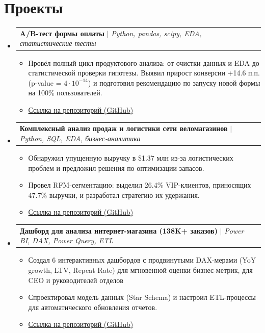 \documentclass[letterpaper,11pt]{article}
\makeatletter
\newcommand{\resumeItem}[1]{
  \item\small{
    {#1 \vspace{-2pt}}
  }
}
\newcommand{\resumeProjectHeading}[2]{
    \item
    \begin{tabular*}{0.97\textwidth}{l@{\extracolsep{\fill}}r}
      \small#1 & #2 \\
    \end{tabular*}\vspace{-7pt}
}
\newcommand{\resumeSubHeadingListStart}{\begin{itemize}[leftmargin=0.15in, label={}]}
\newcommand{\resumeSubHeadingListEnd}{\end{itemize}}
\newcommand{\resumeItemListStart}{\begin{itemize}}
\newcommand{\resumeItemListEnd}{\end{itemize}\vspace{-5pt}}
\makeatother
\begin{document}
\section{Проекты}
    \resumeSubHeadingListStart
    
      \resumeProjectHeading
          {\textbf{A/B-тест формы оплаты} $|$ \emph{Python, pandas, scipy, EDA, статистические тесты}}
          {} %
          \resumeItemListStart
            \resumeItem{Провёл полный цикл продуктового анализа: от очистки данных и EDA до статистической проверки гипотезы. Выявил прирост конверсии +14.6 п.п. (p-value = $4 \cdot 10^{-14}$) и подготовил рекомендацию по запуску новой формы на 100\% пользователей.}
            \resumeItem{\href{https://github.com/AslanZeinalov/AB-test-analysis}{Ссылка на репозиторий (GitHub)}}
          \resumeItemListEnd
          
    \resumeProjectHeading
          {\textbf{Комплексный анализ продаж и логистики сети веломагазинов} $|$ \emph{Python, SQL, EDA, бизнес-аналитика}}
          {} %
          \resumeItemListStart
            \resumeItem{Обнаружил упущенную выручку в \$1.37 млн из-за логистических проблем и предложил решения по оптимизации запасов.}
            \resumeItem{Провел RFM-сегментацию: выделил 26.4\% VIP-клиентов, приносящих 47.7\% выручки, и разработал стратегию их удержания.}
            \resumeItem{\href{https://github.com/AslanZeinalov/retail_store_analysis}{Ссылка на репозиторий (GitHub)}}
          \resumeItemListEnd
          
      \resumeProjectHeading
          {\textbf{Дашборд для анализа интернет-магазина (138K+ заказов)} $|$ \emph{Power BI, DAX, Power Query, ETL}}
          {} %
          \resumeItemListStart
            \resumeItem{Создал 6 интерактивных дашбордов с продвинутыми DAX-мерами (YoY growth, LTV, Repeat Rate) для мгновенной оценки бизнес-метрик, для CEO и руководителей отделов}
            \resumeItem{Спроектировал модель данных (Star Schema) и настроил ETL-процессы для автоматического обновления отчетов.}
            \resumeItem{\href{https://github.com/AslanZeinalov/E-Commerce-Sales-Analytics-dashboard}{Ссылка на репозиторий (GitHub)}}
          \resumeItemListEnd
          
    \resumeSubHeadingListEnd

\end{document}
